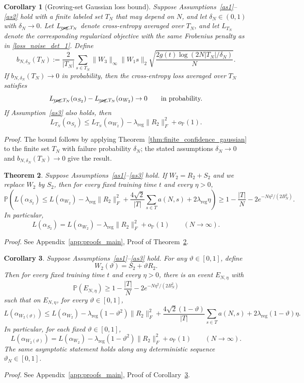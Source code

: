 \documentclass[11pt]{article}
\theoremstyle{plain}
\newtheorem{thm}{Theorem}[section]
\newtheorem{cor}[thm]{Corollary}
\theoremstyle{definition}
\theoremstyle{remark}
\newcommand{\PP}{\mathbb{P}}
\newcommand{\1}{\mathbf{1}}
\newcommand{\proofloc}[1]{\par\noindent\emph{Proof.} #1\par}
\begin{document}
\begin{cor}[Growing-set Gaussian loss bound]
\label{cor:growing_set_gaussian_loss}
Suppose Assumptions~\ref{as1}--\ref{as2} hold with a finite labeled set \(T_N\) that may depend on \(N\), and let \(\delta_N\in(0,1)\) with \(\delta_N\to0\). Let \(L_{\cancel{\mathrm{reg}},T_N}\) denote cross-entropy averaged over \(T_N\), and let \(L_{T_N}\) denote the corresponding regularized objective with the same Frobenius penalty as in \eqref{loss_noise_det_1}. Define
\[
b_{N,\delta_N}(T_N):=
\frac{2}{|T_N|}
\sum_{s\in T_N}
\|W_3\|_\infty\|W_1s\|_2
\sqrt{\frac{2g(t)\log(2N|T_N|/\delta_N)}{N}}.
\]
If \(b_{N,\delta_N}(T_N)\to0\) in probability, then the cross-entropy loss averaged over \(T_N\) satisfies
\[
L_{\cancel{\mathrm{reg}},T_N}(\alpha_{S_2})
-
L_{\cancel{\mathrm{reg}},T_N}(\alpha_{W_2})
\to0
\qquad\text{in probability.}
\]
If Assumption~\ref{as3} also holds, then
\[
L_{T_N}(\alpha_{S_2})
\le
L_{T_N}(\alpha_{W_2})
-\lambda_{\mathrm{reg}}\|R_2\|_F^2
+o_{\PP}(1).
\]
\end{cor}
\proofloc{The bound follows by applying Theorem~\ref{thm:finite_confidence_gaussian} to the finite set \(T_N\) with failure probability \(\delta_N\); the stated assumptions \(\delta_N\to0\) and \(b_{N,\delta_N}(T_N)\to0\) give the result.}

\begin{thm}
\label{theorem_reduction_of_loss}
Suppose Assumptions~\ref{as1}--\ref{as3} hold. If \(W_2=R_2+S_2\) and we replace \(W_2\) by \(S_2\), then for every fixed training time \(t\) and every \(\eta>0\),
\[
\PP\!\left(
L(\alpha_{S_2})
\le
L(\alpha_{W_2})
-\lambda_{\mathrm{reg}}\|R_2\|_F^2
+\frac{4\sqrt{2}}{|T|}\sum_{s\in T}a(N,s)
+2\lambda_{\mathrm{reg}}\eta
\right)
\ge
1-\frac{|T|}{N}-2e^{-N\eta^2/(2B_N^2)}.
\]
In particular,
\[
L(\alpha_{S_2})
=
L(\alpha_{W_2})
-\lambda_{\mathrm{reg}}\|R_2\|_F^2
+o_{\PP}(1)
\qquad(N\to\infty).
\]
\end{thm}
\proofloc{See Appendix~\ref{app:proofs_main}, Proof of Theorem~\ref{theorem_reduction_of_loss}.}

\begin{cor}
\label{cor:scaled_reduction_of_loss}
Suppose Assumptions~\ref{as1}--\ref{as3} hold. For any \(\vartheta\in[0,1]\), define
\[
W_2(\vartheta)=S_2+\vartheta R_2.
\]
Then for every fixed training time \(t\) and every \(\eta>0\), there is an event \(E_{N,\eta}\) with
\[
\PP(E_{N,\eta})
\ge
1-\frac{|T|}{N}-2e^{-N\eta^2/(2B_N^2)}
\]
such that on \(E_{N,\eta}\), for every \(\vartheta\in[0,1]\),
\[
L(\alpha_{W_2(\vartheta)})
\le
L(\alpha_{W_2})
-\lambda_{\mathrm{reg}}(1-\vartheta^2)\|R_2\|_F^2
+\frac{4\sqrt{2}(1-\vartheta)}{|T|}\sum_{s\in T}a(N,s)
+2\lambda_{\mathrm{reg}}(1-\vartheta)\eta.
\]
In particular, for each fixed \(\vartheta\in[0,1]\),
\[
L(\alpha_{W_2(\vartheta)})
=
L(\alpha_{W_2})
-\lambda_{\mathrm{reg}}(1-\vartheta^2)\|R_2\|_F^2
+o_{\PP}(1)
\qquad(N\to\infty).
\]
The same asymptotic statement holds along any deterministic sequence \(\vartheta_N\in[0,1]\).
\end{cor}
\proofloc{See Appendix~\ref{app:proofs_main}, Proof of Corollary~\ref{cor:scaled_reduction_of_loss}.}
\end{document}
